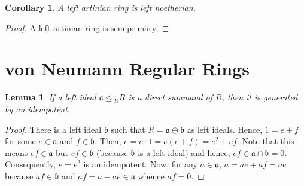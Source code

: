 \documentclass[12pt]{article}
\theoremstyle{thmstyle}
\newtheorem{lemma}[theorem]{Lemma}
\theoremstyle{defstyle}
\newtheorem*{corollary}{Corollary}
\newcommand{\fraka}{\mathfrak{a}} %
\newcommand{\frakb}{\mathfrak{b}} %
\begin{document}
\begin{corollary}
    A left artinian ring is left noetherian.
\end{corollary}
\begin{proof}
    A left artinian ring is semiprimary.
\end{proof}

\section{von Neumann Regular Rings}

\begin{lemma}
    If a left ideal $\fraka\unlhd {}_RR$ is a direct summand of $R$, then it is generated by an idempotent.
\end{lemma}
\begin{proof}
    There is a left ideal $\frakb$ such that $R = \fraka\oplus\frakb$ as left ideals. Hence, $1 = e + f$ for some $e\in\fraka$ and $f\in\frakb$. Then, $e = e\cdot 1 = e(e + f) = e^2 + ef$. Note that this means $ef\in \fraka$ but $ef\in\frakb$ (because $\frakb$ is a left ideal) and hence, $ef\in \fraka\cap\frakb = 0$. Consequently, $e = e^2$ is an idempotent. Now, for any $a\in\fraka$, $a = ae + af = ae$ because $af\in\frakb$ and $af = a - ae\in\fraka$ whence $af = 0$.
\end{proof}
\end{document}
